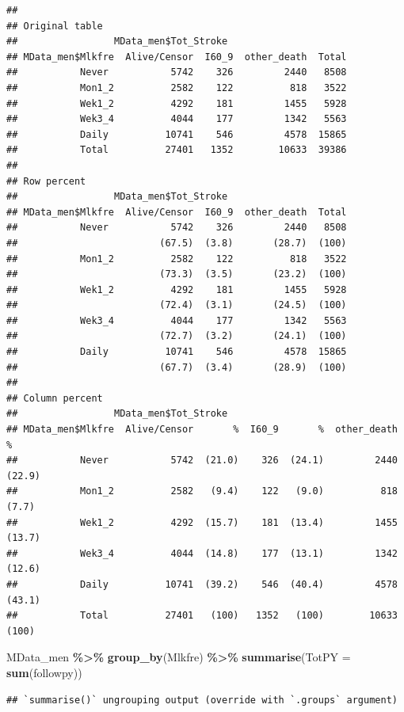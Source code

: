 \documentclass[
]{article}
\newenvironment{Shaded}{\begin{snugshade}}{\end{snugshade}}
\newcommand{\DataTypeTok}[1]{\textcolor[rgb]{0.13,0.29,0.53}{#1}}
\newcommand{\KeywordTok}[1]{\textcolor[rgb]{0.13,0.29,0.53}{\textbf{#1}}}
\newcommand{\NormalTok}[1]{#1}
\newcommand{\OperatorTok}[1]{\textcolor[rgb]{0.81,0.36,0.00}{\textbf{#1}}}
\newcommand{\StringTok}[1]{\textcolor[rgb]{0.31,0.60,0.02}{#1}}
\begin{document}
\begin{verbatim}
## 
## Original table 
##                 MData_men$Tot_Stroke
## MData_men$Mlkfre  Alive/Censor  I60_9  other_death  Total
##           Never           5742    326         2440   8508
##           Mon1_2          2582    122          818   3522
##           Wek1_2          4292    181         1455   5928
##           Wek3_4          4044    177         1342   5563
##           Daily          10741    546         4578  15865
##           Total          27401   1352        10633  39386
## 
## Row percent 
##                 MData_men$Tot_Stroke
## MData_men$Mlkfre  Alive/Censor  I60_9  other_death  Total
##           Never           5742    326         2440   8508
##                         (67.5)  (3.8)       (28.7)  (100)
##           Mon1_2          2582    122          818   3522
##                         (73.3)  (3.5)       (23.2)  (100)
##           Wek1_2          4292    181         1455   5928
##                         (72.4)  (3.1)       (24.5)  (100)
##           Wek3_4          4044    177         1342   5563
##                         (72.7)  (3.2)       (24.1)  (100)
##           Daily          10741    546         4578  15865
##                         (67.7)  (3.4)       (28.9)  (100)
## 
## Column percent 
##                 MData_men$Tot_Stroke
## MData_men$Mlkfre  Alive/Censor       %  I60_9       %  other_death       %
##           Never           5742  (21.0)    326  (24.1)         2440  (22.9)
##           Mon1_2          2582   (9.4)    122   (9.0)          818   (7.7)
##           Wek1_2          4292  (15.7)    181  (13.4)         1455  (13.7)
##           Wek3_4          4044  (14.8)    177  (13.1)         1342  (12.6)
##           Daily          10741  (39.2)    546  (40.4)         4578  (43.1)
##           Total          27401   (100)   1352   (100)        10633   (100)
\end{verbatim}

\begin{Shaded}
\begin{Highlighting}[]
\NormalTok{MData\_men }\OperatorTok{\%\textgreater{}\%}\StringTok{ }
\StringTok{  }\KeywordTok{group\_by}\NormalTok{(Mlkfre) }\OperatorTok{\%\textgreater{}\%}\StringTok{ }
\StringTok{  }\KeywordTok{summarise}\NormalTok{(}\DataTypeTok{TotPY =} \KeywordTok{sum}\NormalTok{(followpy))}
\end{Highlighting}
\end{Shaded}

\begin{verbatim}
## `summarise()` ungrouping output (override with `.groups` argument)
\end{verbatim}
\end{document}
